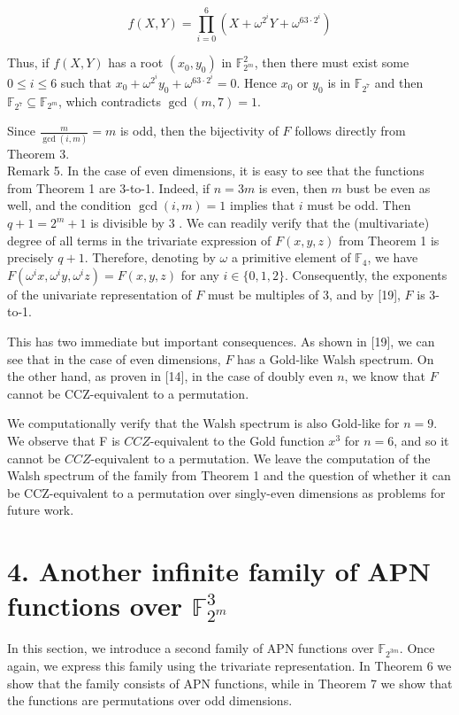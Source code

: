 \documentclass[10pt]{article}
\begin{document}
$$
f(X, Y)=\prod_{i=0}^{6}\left(X+\omega^{2^{i}} Y+\omega^{63 \cdot 2^{i}}\right)
$$

Thus, if $f(X, Y)$ has a root $\left(x_{0}, y_{0}\right)$ in $\mathbb{F}_{2^{m}}^{2}$, then there must exist some $0 \leq i \leq 6$ such that $x_{0}+\omega^{2^{i}} y_{0}+ \omega^{63 \cdot 2^{i}}=0$. Hence $x_{0}$ or $y_{0}$ is in $\mathbb{F}_{2^{7}}$ and then $\mathbb{F}_{2^{7}} \subseteq \mathbb{F}_{2^{m}}$, which contradicts $\operatorname{gcd}(m, 7)=1$.

Since $\frac{m}{\operatorname{gcd}(i, m)}=m$ is odd, then the bijectivity of $F$ follows directly from Theorem 3.\\
Remark 5. In the case of even dimensions, it is easy to see that the functions from Theorem 1 are 3-to-1. Indeed, if $n=3 m$ is even, then $m$ bust be even as well, and the condition $\operatorname{gcd}(i, m)=1$ implies that $i$ must be odd. Then $q+1=2^{m}+1$ is divisible by 3 . We can readily verify that the (multivariate) degree of all terms in the trivariate expression of $F(x, y, z)$ from Theorem 1 is precisely $q+1$. Therefore, denoting by $\omega$ a primitive element of $\mathbb{F}_{4}$, we have $F\left(\omega^{i} x, \omega^{i} y, \omega^{i} z\right)=F(x, y, z)$ for any $i \in\{0,1,2\}$. Consequently, the exponents of the univariate representation of $F$ must be multiples of 3, and by [19], $F$ is 3-to-1.

This has two immediate but important consequences. As shown in [19], we can see that in the case of even dimensions, $F$ has a Gold-like Walsh spectrum. On the other hand, as proven in [14], in the case of doubly even $n$, we know that $F$ cannot be CCZ-equivalent to a permutation.

We computationally verify that the Walsh spectrum is also Gold-like for $n=9$. We observe that F is $C C Z$-equivalent to the Gold function $x^{3}$ for $n=6$, and so it cannot be $C C Z$-equivalent to a permutation. We leave the computation of the Walsh spectrum of the family from Theorem 1 and the question of whether it can be CCZ-equivalent to a permutation over singly-even dimensions as problems for future work.

\section*{4. Another infinite family of APN functions over $\mathbb{F}_{2^{m}}^{3}$}
In this section, we introduce a second family of APN functions over $\mathbb{F}_{2^{3 m}}$. Once again, we express this family using the trivariate representation. In Theorem 6 we show that the family consists of APN functions, while in Theorem 7 we show that the functions are permutations over odd dimensions.
\end{document}
